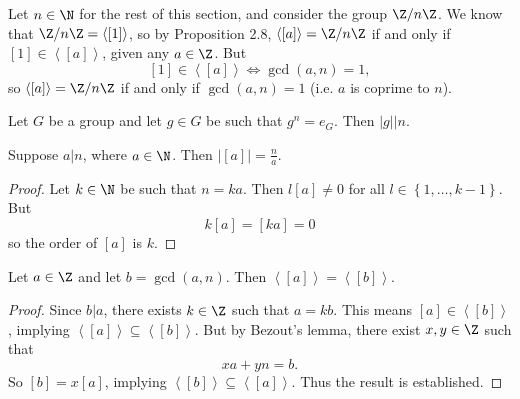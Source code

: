 \documentclass[pmath347]{subfiles}
\begin{document}
    \np[Generators of $\Z /n\Z$]Let $n\in\N$ for the rest of this section, and consider the group $\Z /n\Z$. We know that $\Z /n\Z = \left< \left[ 1 \right]  \right>$, so by Proposition 2.8, $\left< \left[ a \right]  \right> = \Z /n\Z$ if and only if $\left[ 1 \right] \in \left< \left[ a \right]  \right>$, given any $a\in\Z$. But
    \begin{equation*}
        \left[ 1 \right] \in \left< \left[ a \right]  \right> \iff \gcd\left( a,n \right) = 1, 
    \end{equation*}
    so $\left< \left[ a \right]  \right> = \Z /n\Z$ if and only if $\gcd\left( a,n \right) = 1$ (i.e. $a$ is coprime to $n$). 

    \clearpage
    \begin{prop}{}
        Let $G$ be a group and let $g\in G$ be such that $g^n=e_G$. Then $\left.\left| g \right|\right| n$. 
    \end{prop}
    
    \begin{prop}{}
        Suppose $a|n$, where $a\in\N$. Then $\left| \left[ a \right]  \right| = \frac{n}{a}$.
    \end{prop}

    \begin{proof}
        Let $k\in\N$ be such that $n=ka$. Then $l\left[ a \right] \neq 0$ for all $l\in\left\lbrace 1,\ldots,k-1 \right\rbrace$. But
        \begin{equation*}
            k\left[ a \right] = \left[ ka \right] = 0
        \end{equation*}
        so the order of $\left[ a \right]$ is $k$.
    \end{proof}

    \begin{prop}{}
        Let $a\in\Z$ and let $b=\gcd\left( a,n \right)$. Then $\left< \left[ a \right]  \right> = \left< \left[ b \right]  \right>$.  
    \end{prop}

    \begin{proof}
        Since $b|a$, there exists $k\in\Z$ such that $a=kb$. This means $\left[ a \right] \in \left< \left[ b \right]  \right>$, implying $\left< \left[ a \right]  \right> \subseteq \left< \left[ b \right]  \right>$. But by Bezout's lemma, there exist $x,y\in\Z$ such that
        \begin{equation*}
            xa+yn = b.
        \end{equation*}
        So $\left[ b \right] = x\left[ a \right]$, implying $\left< \left[ b \right]  \right> \subseteq \left< \left[ a \right]  \right>$. Thus the result is established.  
    \end{proof}
    
\end{document}
